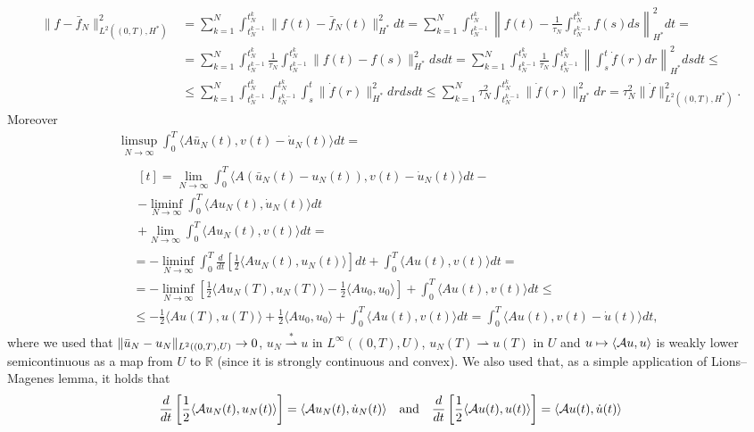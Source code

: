 \documentclass[a4paper,10pt,twoside]{amsbook}
\numberwithin{section}{chapter}
\numberwithin{equation}{chapter}
\theoremstyle{definition}
\DeclarePairedDelimiter{\norm}{\lVert}{\rVert}
\DeclarePairedDelimiter{\dual}{\langle}{\rangle}
\begin{document}
\[
\begin{split}
\|f-\bar{f}_N\|_{L^2((0,T),H^*)}^2&=\sum_{k=1}^N\int_{t_N^{k-1}}^{t_N^k}\|f(t)-\bar{f}_N(t)\|_{H^*}^2dt=\sum_{k=1}^N\int_{t_N^{k-1}}^{t_N^k}\left\|f(t)-\frac{1}{\tau_N}\int_{t_N^{k-1}}^{t_N^k}f(s)ds\right\|_{H^*}^2dt=\\
&=\sum_{k=1}^N\int_{t_N^{k-1}}^{t_N^k}\frac{1}{\tau_N}\int_{t_N^{k-1}}^{t_N^k}\|f(t)-f(s)\|_{H^*}^2dsdt=\sum_{k=1}^N\int_{t_N^{k-1}}^{t_N^k}\frac{1}{\tau_N}\int_{t_N^{k-1}}^{t_N^k}\left\|\int_s^t\dot{f}(r)dr\right\|_{H^*}^2dsdt\le\\
&\le\sum_{k=1}^N\int_{t_N^{k-1}}^{t_N^k}\int_{t_N^{k-1}}^{t_N^k}\int_s^t\|\dot{f}(r)\|_{H^*}^2drdsdt\le\sum_{k=1}^N\tau_N^2\int_{t_N^{k-1}}^{t_N^k}\|\dot{f}(r)\|_{H^*}^2dr=\tau_N^2\|\dot{f}\|_{L^2((0,T),H^*)}^2.
\end{split}
\]
Moreover
\[
\begin{multlined}
\limsup_{N\to\infty}\int_0^T\langle A\bar{u}_N(t),v(t)-\dot{u}_N(t)\rangle dt=\\
\begin{split}
&\begin{multlined}[t]
=\lim_{N\to\infty}\int_0^T\langle A(\bar{u}_N(t)-u_N(t)),v(t)-\dot{u}_N(t)\rangle dt-\\
-\liminf_{N\to\infty}\int_0^T\langle Au_N(t),\dot{u}_N(t)\rangle dt\\+\lim_{N\to\infty}\int_0^T\langle Au_N(t),v(t)\rangle dt=
\end{multlined}\\
&=-\liminf_{N\to\infty}\int_0^T\frac{d}{dt}\left[\frac{1}{2}\langle Au_N(t),u_N(t)\rangle\right]dt+\int_0^T\langle Au(t),v(t)\rangle dt=\\
&=-\liminf_{N\to\infty}\left[\frac{1}{2}\langle Au_N(T),u_N(T)\rangle-\frac{1}{2}\langle Au_0,u_0\rangle\right]+\int_0^T\langle Au(t),v(t)\rangle dt\le\\
&\le-\frac{1}{2}\langle Au(T),u(T)\rangle+\frac{1}{2}\langle Au_0,u_0\rangle+\int_0^T\langle Au(t),v(t)\rangle dt=\int_0^T\langle Au(t),v(t)-\dot{u}(t)\rangle dt,
\end{split}
\end{multlined}
\]
where we used that $\norm{\bar u_N-u_N}_{L^2((0,T),U)}\to0$, $u_N\overset{*}{\rightharpoonup}u$ in $L^\infty((0,T),U)$, $u_N(T)\rightharpoonup u(T)$ in $U$ and $u\mapsto\dual{\mathcal{A}u,u}$ is weakly lower semicontinuous as a map from $U$ to $\mathbb{R}$ (since it is strongly continuous and convex). We also used that, as a simple application of Lions--Magenes lemma, it holds that
\[
\frac{d}{dt}\left[\frac{1}{2}\dual{\mathcal{A}u_N(t),u_N(t)}\right]=\dual{\mathcal{A}u_N(t),\dot u_N(t)}\quad\text{and}\quad\frac{d}{dt}\left[\frac{1}{2}\dual{\mathcal{A}u(t),u(t)}\right]=\dual{\mathcal{A}u(t),\dot u(t)}
\]
\end{document}
